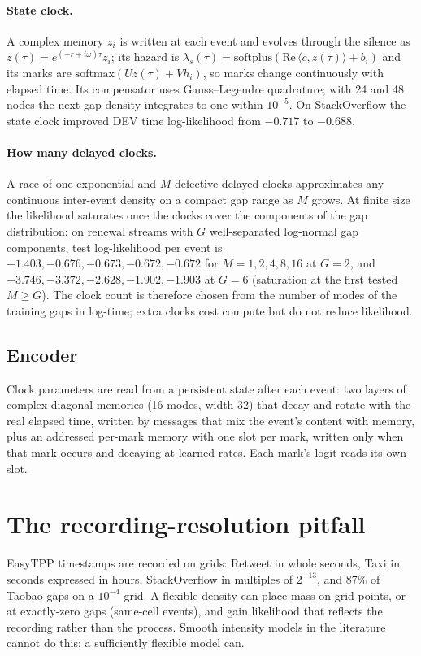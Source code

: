 \documentclass[11pt]{article}
\begin{document}
\paragraph{State clock.} A complex memory $z_i$ is written at each event and evolves through the silence as $z(\tau)=e^{(-r+i\omega)\tau}z_i$; its hazard is $\lambda_s(\tau)=\mathrm{softplus}(\mathrm{Re}\,\langle c,z(\tau)\rangle+b_i)$ and its marks are $\mathrm{softmax}(Uz(\tau)+Vh_i)$, so marks change continuously with elapsed time. Its compensator uses Gauss--Legendre quadrature; with 24 and 48 nodes the next-gap density integrates to one within $10^{-5}$. On StackOverflow the state clock improved DEV time log-likelihood from $-0.717$ to $-0.688$.

\paragraph{How many delayed clocks.} A race of one exponential and $M$ defective delayed clocks approximates any continuous inter-event density on a compact gap range as $M$ grows. At finite size the likelihood saturates once the clocks cover the components of the gap distribution: on renewal streams with $G$ well-separated log-normal gap components, test log-likelihood per event is $-1.403, -0.676, -0.673, -0.672, -0.672$ for $M=1,2,4,8,16$ at $G=2$, and $-3.746, -3.372, -2.628, -1.902, -1.903$ at $G=6$ (saturation at the first tested $M\ge G$). The clock count is therefore chosen from the number of modes of the training gaps in log-time; extra clocks cost compute but do not reduce likelihood.

\subsection{Encoder}
Clock parameters are read from a persistent state after each event: two layers of complex-diagonal memories (16 modes, width 32) that decay and rotate with the real elapsed time, written by messages that mix the event's content with memory, plus an addressed per-mark memory with one slot per mark, written only when that mark occurs and decaying at learned rates. Each mark's logit reads its own slot.

\section{The recording-resolution pitfall}\label{sec:pitfall}
EasyTPP timestamps are recorded on grids: Retweet in whole seconds, Taxi in seconds expressed in hours, StackOverflow in multiples of $2^{-13}$, and 87\% of Taobao gaps on a $10^{-4}$ grid. A flexible density can place mass on grid points, or at exactly-zero gaps (same-cell events), and gain likelihood that reflects the recording rather than the process. Smooth intensity models in the literature cannot do this; a sufficiently flexible model can.
\end{document}
